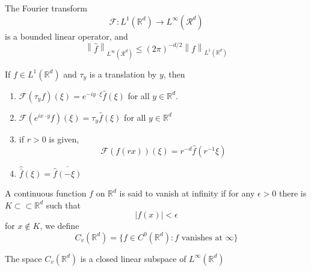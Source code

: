 \documentclass{article}
\newcommand{\norm}[1]{\left\lVert#1\right\rVert}
\begin{document}
\begin{proposition}
  The Fourier transform
  \begin{equation*}
    \mathcal{F}: L^1(\mathbb{R}^d) \to L^\infty (\mathcal{R}^d)
  \end{equation*}
  is a bounded linear operator, and 
  \begin{equation*}
    \norm{\hat{f}}_{L^\infty (\mathcal{R}^d)} \leq (2\pi)^{-d/2} \norm{f}_{L^1(\mathbb{R}^d)}
      
  \end{equation*}
\end{proposition}

\begin{proposition}
  If $f \in L^1(\mathbb{R}^d)$ and $\tau_y$ is a translation by $y$, then
  \begin{enumerate}
  \item $\mathcal{F}(\tau_yf)(\xi) = e^{-iy \cdot \xi}\hat{f}(\xi)$ for all $y \in \mathbb{R}^d$. 
\item $\mathcal{F}(e^{ix \cdot y}f)(\xi) = \tau_y \hat{f}(\xi)$ for all $y \in \mathbb{R}^d$ 
    \item if $r > 0$ is given,
      \begin{equation*}
        \mathcal{F}(f(rx))(\xi) = r^{-d}\hat{f}(r^{-1}\xi)
      \end{equation*}
  
    \item $\hat{\bar{f}}(\xi) = \overline{\hat{f}(-\xi)}$
  \end{enumerate}
\end{proposition}

\begin{principle}
  A continuous function $f$ on $\mathbb{R}^d$ is said to vanish at infinity if for any $\epsilon > 0$ there is $K \subset\subset \mathbb{R}^d$ such that
  \begin{equation*}
    |f(x)| < \epsilon
  \end{equation*}
  for $x \not\in K$, we define
  \begin{equation*}
    C_v(\mathbb{R}^d) = \{f \in C^0(\mathbb{R}^d): \text{$f$ vanishes at $\infty$}\}
  \end{equation*}
\end{principle}

\begin{theorem}
  The space $C_v(\mathbb{R}^d)$ is a closed linear subspace of $L^\infty(\mathbb{R}^d)$
\end{theorem}
\end{document}
